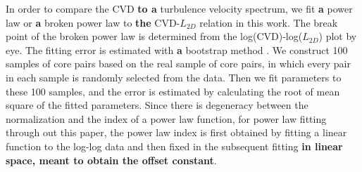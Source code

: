 \documentclass[iop,revtex4]{emulateapj}
\begin{document}
In order to compare the CVD {\bf to a} turbulence velocity spectrum, we fit {\bf a} power law or {\bf a} broken power law to {\bf the} CVD-$L_{2D}$ relation in this work. The break point of the broken power law is determined from the log(CVD)-log($L_{2D}$) plot by eye. The fitting error is estimated with {\bf a} bootstrap method \citep{nr}. We construct 100 samples of core pairs based on the real sample of core pairs, in which every pair in each sample is randomly selected from the data. Then we fit parameters to these 100 samples, and the error is estimated by calculating the root of mean square of the fitted parameters. Since there is degeneracy between the normalization and the index of a power law function, for power law fitting through out this paper, the power law index is first obtained by fitting a linear function to the log-log data and then fixed in the subsequent fitting {\bf in linear space, meant to obtain the offset constant}.
\end{document}
